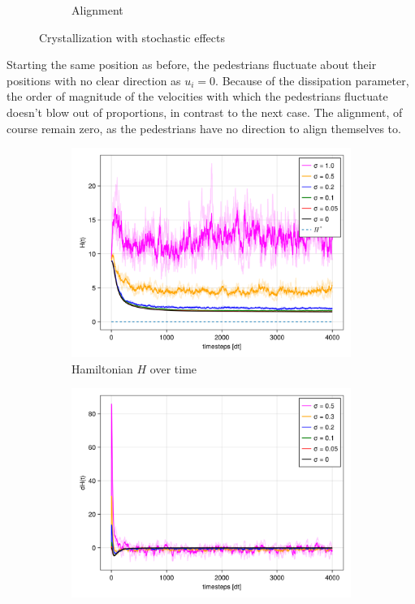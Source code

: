 \begin{itemize}
\begin{figure}[H]
\begin{subfigure}{.49\textwidth}
            \caption{Alignment}
            \label{plot:stoc_crys_alignment}
        \end{subfigure}
        \caption{Crystallization with stochastic effects}
        \label{plot:stoc_crys}
    \end{figure}
Starting the same position as before, the pedestrians fluctuate about their positions with no clear direction as $u_i = 0$. Because of the dissipation parameter, the order of magnitude of the velocities with which the pedestrians fluctuate doesn't blow out of proportions, in contrast to the next case. The alignment, of course remain zero, as the pedestrians have no direction to align themselves to.

    \begin{figure}[H]
        \centering
        \begin{subfigure}{.49\textwidth}
            \centering
            \includegraphics[width=\linewidth]{figures/ch5_basic_stoch/H_stochasic_crys.png}
            \caption{Hamiltonian $H$ over time}
            \label{plot:stoc_crys_h}
        \end{subfigure}
        \begin{subfigure}{.49\textwidth}
            \centering
            \includegraphics[width=\linewidth]{figures/ch5_basic_stoch/dH_stochasic_crys.png}

\end{subfigure}
\end{figure}
\end{itemize}

